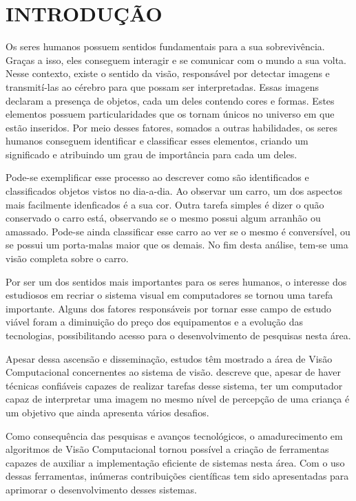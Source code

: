 \chapter{INTRODUÇÃO}

Os seres humanos possuem sentidos fundamentais para a sua sobrevivência. Graças a isso, eles conseguem interagir e se comunicar com o mundo a sua volta. Nesse contexto, existe o sentido da visão, responsável por detectar imagens e transmití-las ao cérebro para que possam ser interpretadas. Essas imagens declaram a presença de objetos, cada um deles contendo cores e formas. Estes elementos possuem particularidades que os tornam únicos no universo em que estão inseridos. Por meio desses fatores, somados a outras habilidades, os seres humanos conseguem identificar e classificar esses elementos, criando um significado e atribuindo um grau de importância para cada um deles.

Pode-se exemplificar esse processo ao descrever como são identificados e classificados objetos vistos no dia-a-dia. Ao observar um carro, um dos aspectos mais facilmente idenficados é a sua cor. Outra tarefa simples é dizer o quão conservado o carro está, observando se o mesmo possui algum arranhão ou amassado. Pode-se ainda classificar esse carro ao ver se o mesmo é conversível, ou se possui um porta-malas maior que os demais. No fim desta análise, tem-se uma visão completa sobre o carro.

Por ser um dos sentidos mais importantes para os seres humanos, o interesse dos estudiosos em recriar o sistema visual em computadores se tornou uma tarefa importante. Alguns dos fatores responsáveis por tornar esse campo de estudo viável foram a diminuição do preço dos equipamentos e a evolução das tecnologias, possibilitando acesso para o desenvolvimento de pesquisas nesta área.

Apesar dessa ascensão e disseminação, estudos têm mostrado a área de Visão Computacional concernentes ao sistema de visão.  descreve que, apesar de haver técnicas confiáveis capazes de realizar tarefas desse sistema, ter um computador capaz de interpretar uma imagem no mesmo nível de percepção de uma criança é um objetivo que ainda apresenta vários desafios.

Como consequência das pesquisas e avanços tecnológicos, o amadurecimento em algoritmos de Visão Computacional tornou possível a criação de ferramentas capazes de auxiliar a implementação eficiente de sistemas nesta área. Com o uso dessas ferramentas, inúmeras contribuições científicas tem sido apresentadas para aprimorar o desenvolvimento desses sistemas.

